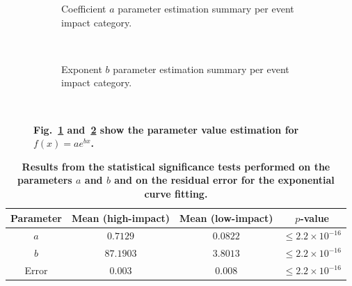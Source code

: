 \documentclass[10pt,letterpaper]{article}
\newcommand{\newtext}[1]{{\leavevmode\color{blue}#1}}
\begin{document}
\begin{figure}
  \centering
  \begin{subfigure}{.5\textwidth}
    \caption{Coefficient $a$ parameter estimation summary per event impact category. %
    }
    \label{fig:param-a}
  \end{subfigure}%
  ~%
  \begin{subfigure}{.5\textwidth}
    \caption{Exponent $b$ parameter estimation summary per event impact category. %
    }
    \label{fig:param-b}
  \end{subfigure}%
  ~ %

  \caption{\textbf{Fig.~\ref{fig:param-a} and~\ref{fig:param-b} show the parameter value estimation for $f(x)=ae^{bx}$.}}
  \label{fig:param_est}
\end{figure}


\begin{table}
  \centering
  \begin{tabularx}{\textwidth}{cccc}
    \toprule
    \textbf{Parameter} & \textbf{Mean (high-impact)} & \textbf{Mean (low-impact)} & \textbf{$p$-value} \\ \midrule
    $a$ & $0.7129$ & $0.0822$ & $\leq2.2\times 10^{-16}$  \\ 
    $b$ & $87.1903$ & $3.8013$ &$\leq2.2\times 10^{-16}$ \\
    Error & $0.003$ & $0.008$ & $\leq2.2\times 10^{-16}$ \\ \bottomrule
  \end{tabularx}
  \caption{\textbf{\newtext{
        Results from the statistical significance tests performed on the parameters $a$ and $b$
    and on the residual error for the exponential curve fitting.}
    }}
  \label{tab:curve_fitting}
\end{table}
\end{document}

